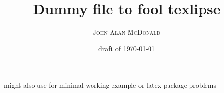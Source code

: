 \documentclass[11pt]{article}
\title{Dummy file to fool texlipse}
\author{\textsc{John Alan McDonald}}
\date{draft of \today}
\begin{document}
\maketitle

might also use for minimal working example or latex package problems
 
\end{document}
